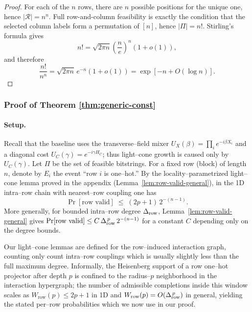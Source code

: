 \documentclass[a4paper,onecolumn,11pt,unpublished]{quantumarticle}
\theoremstyle{remark}
\begin{document}
\begin{proof}
For each of the \(n\) rows, there are \(n\) possible positions for the unique
one, hence \(|\mathcal R|=n^n\).  Full row-and-column feasibility is exactly
the condition that the selected column labels form a permutation of
\([n]\), hence \(|\Pi|=n!\).  Stirling's formula gives
\[
  n!
  =
  \sqrt{2\pi n}\left(\frac ne\right)^n(1+o(1)),
\]
and therefore
\[
  \frac{n!}{n^n}
  =
  \sqrt{2\pi n}\,e^{-n}(1+o(1))
  =
  \exp[-n+O(\log n)].
\]
\end{proof}



\subsubsection{Proof of Theorem \ref{thm:generic-const}}%
\label{subsec:depth-p-bounds}

\paragraph{Setup.}Recall that the baseline uses the transverse–field mixer
$U_X(\beta)=\prod_i e^{-i\beta X_i}$ and a diagonal cost
$U_C(\gamma)=e^{-i\gamma H_C}$; thus light–cone growth is caused only by $U_C(\gamma)$.
Let $\Pi$ be the set of feasible bitstrings. For a fixed row (block) of length $n$, denote by $E_i$ the event “row $i$ is one–hot.” By the locality–parametrized light–cone lemma proved in the appendix
(Lemma~\ref{lem:row-valid-general}), in the 1D intra–row chain with nearest–row
coupling one has
\[
  \Pr[\text{row valid}]
  \;\le\;
  (2p{+}1)\,2^{-(n-1)}.
\]
More generally, for bounded intra–row degree $\Delta_{\rm row}$,
Lemma~\ref{lem:row-valid-general} gives
\(
  \Pr[\text{row valid}] \le C\,\Delta_{\rm row}^{\,p}\,2^{-(n-1)}
\)
for a constant $C$ depending only on the degree bounds. 

\medskip
\noindent 
Our light–cone lemmas are defined for the row–induced interaction graph, counting only count intra–row couplings which is usually slightly less than the full maximum degree. Informally, the Heisenberg support of a row one–hot projector after depth $p$
is confined to the radius–$p$ neighborhood in the interaction hypergraph; the
number of admissible completions inside this window scales as
$W_{\mathrm{row}}(p)\le 2p{+}1$ in 1D and $W_{\mathrm{row}}(p)=O(\Delta_{\rm row}^{\,p})$ in general, yielding the stated per–row probabilities which we now use in our proof.%
\end{document}
